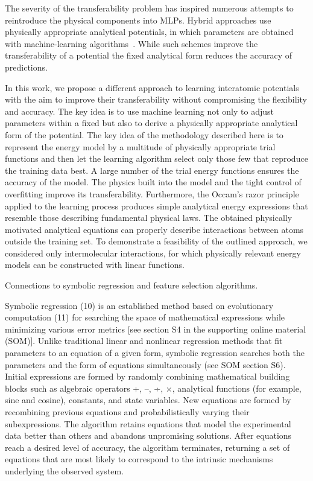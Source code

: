 \documentclass[aip,jcp,reprint,amsmath,amssymb,nature]{revtex4-1}
\begin{document}
The severity of the transferability problem has inspired numerous attempts to reintroduce the physical components into MLPs. 
Hybrid approaches use physically appropriate analytical potentials, in which parameters are obtained with machine-learning algorithms~\cite{Ghasemi2015}. 
While such schemes improve the transferability of a potential the fixed analytical form reduces the accuracy of predictions.


In this work, we propose a different approach to learning interatomic potentials with the aim to improve their transferability without compromising the flexibility and accuracy. 
The key idea is to use machine learning not only to adjust parameters within a fixed but also to derive a physically appropriate analytical form of the potential.
The key idea of the methodology described here is to represent the energy model by a multitude of physically appropriate trial functions and then let the learning algorithm select only those few that reproduce the training data best. 
A large number of the trial energy functions ensures the accuracy of the model. 
The physics built into the model and the tight control of overfitting improve its transferability. 
Furthermore, the Occam's razor principle applied to the learning process produces simple analytical energy expressions that resemble those describing fundamental physical laws. 
The obtained physically motivated analytical equations can properly describe interactions between atoms outside the training set. 
To demonstrate a feasibility of the outlined approach, we considered only intermolecular interactions, for which physically relevant energy models can be constructed with linear functions.

Connections to symbolic regression and feature selection algorithms.

Symbolic regression (10) is an established method based on evolutionary computation (11) for searching the space of mathematical expressions while minimizing various error metrics [see section S4 in the supporting online material (SOM)]. Unlike traditional linear and nonlinear regression methods that fit parameters to an equation of a given form, symbolic regression searches both the parameters and the form of equations simultaneously (see SOM section S6). Initial expressions are formed by randomly combining mathematical building blocks such as algebraic operators {+, –, ÷, ×}, analytical functions (for example, sine and cosine), constants, and state variables. New equations are formed by recombining previous equations and probabilistically varying their subexpressions. The algorithm retains equations that model the experimental data better than others and abandons unpromising solutions. After equations reach a desired level of accuracy, the algorithm terminates, returning a set of equations that are most likely to correspond to the intrinsic mechanisms underlying the observed system.
\end{document}
